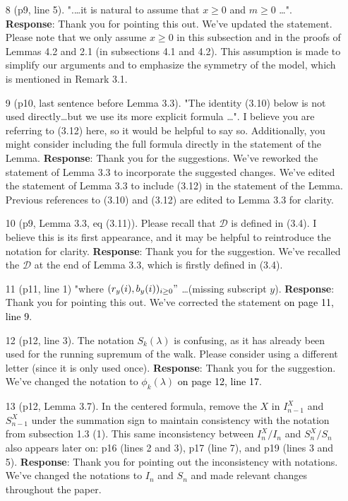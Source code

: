 \documentclass[11pt,a4paper]{article}
\numberwithin{equation}{section}
\newcommand{\PL}[2]{\textcolor{black}{on page {#1}, line {#2}}}
\begin{document}
\begin{itemize}
		
		
		\item[8] (p9, line 5). ".\dots it is natural to assume that $x \geq 0$ and $m \geq 0$ \dots".
		\subitem \textbf{Response}:  Thank you for pointing this out.  We've updated the statement. Please note that we only assume $x\geq 0$ in this subsection and in the proofs of Lemmas 4.2 and 2.1 (in subsections 4.1 and 4.2). This assumption is made to simplify our arguments and to emphasize the symmetry of the model, which is mentioned in Remark 3.1.
		
		\item [9] (p10, last sentence before Lemma 3.3). "The identity (3.10) below is not used directly\dots but we use its more explicit formula \dots ". I believe you are referring to (3.12) here, so it would be helpful to say so. Additionally, you might consider including the full formula directly in the statement of the Lemma.
		\subitem \textbf{Response}: Thank you for the suggestions. We've reworked the statement of Lemma 3.3 to incorporate the suggested changes.
		We've edited the statement of Lemma 3.3 to include (3.12) in the statement of the Lemma. Previous references to (3.10) and (3.12) are edited to Lemma 3.3 for clarity.
		
		\item [10] (p9, Lemma 3.3, eq (3.11)). Please recall that $\mathcal{D}$ is defined in (3.4). I believe this is its first appearance, and it may be helpful to reintroduce the notation for clarity.
		\subitem \textbf{Response}:  Thank you for the suggestion. We've recalled the $\mathcal{D}$ at the end of Lemma 3.3, which is firstly defined in (3.4).
		
		
		
		\item [11] (p11, line 1) "where $(r_y(i),b_y(i))_{i\geq 0}"$ \dots (missing subscript $y$).
		\subitem \textbf{Response}:  Thank you for pointing this out.  We've corrected the statement \PL{11}{9}.
		
		
		\item[12] (p12, line 3). The notation $S_k(\lambda)$ is confusing, as it has already been used for the running supremum of the walk. Please consider using a different letter (since it is only used once).
		\subitem \textbf{Response}:  Thank you for the suggestion.  We've changed the notation to ${\phi}_k(\lambda) $ \PL{12}{17}.
		
		
		\item[13] (p12, Lemma 3.7). In the centered formula, remove the $X$ in $I^X_{n-1}$
		and $S^X_{n-1}$ under the summation sign to maintain consistency with the notation from subsection 1.3 (1). This same inconsistency between $I^X_n /I_n$ and $S^X_n/S_n$ also appears later on: p16 (lines 2 and 3), p17 (line 7), and p19 (lines 3 and 5).
		\subitem \textbf{Response}:  Thank you for pointing out the inconsistency with notations.  We've changed the notations to $I_n$ and $S_n$ and made relevant changes throughout the paper.
		

\end{itemize}
\end{document}
